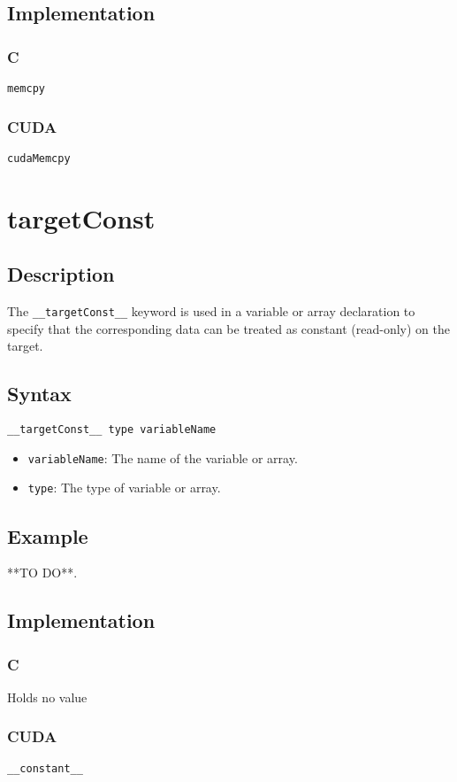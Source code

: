 \subsection{Implementation}
\subsubsection{C}
\verb+memcpy+
\subsubsection{CUDA}
\verb+cudaMemcpy+


\newpage
\section{targetConst}
\subsection{Description}

The \verb+__targetConst__+ keyword is used in a variable or array declaration
to specify that the corresponding data can be treated as constant (read-only) on the target.

\subsection{Syntax}
\begin{verbatim}
__targetConst__ type variableName
\end{verbatim}

\begin{itemize}
\item \verb+variableName+: The name of the variable or array.
\item \verb+type+: The type of variable or array.
\end{itemize}


\subsection{Example}
**TO DO**.
\subsection{Implementation}
\subsubsection{C}
Holds no value
\subsubsection{CUDA}
\verb+__constant__+

